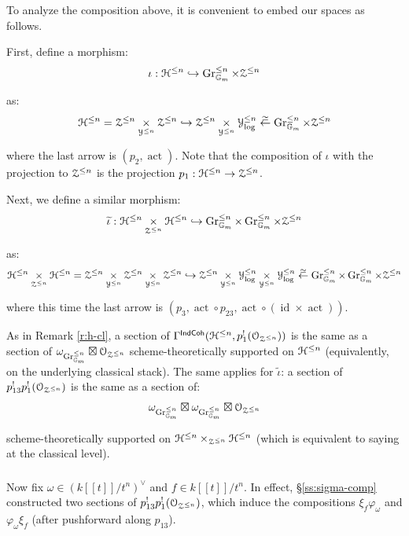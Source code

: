 \documentclass[reqno,11pt]{amsart}
\numberwithin{equation}{subsection}
\theoremstyle{remark}
\newcommand{\into}{\hookrightarrow}
\newcommand{\bG}{{\mathbb G}}
\newcommand{\sH}{{\EuScript H}}
\newcommand{\sO}{{\EuScript O}}
\newcommand{\sY}{{\EuScript Y}}
\newcommand{\sZ}{{\EuScript Z}}
\newcommand{\on}{\operatorname}
\newcommand{\id}{\on{id}}
\newcommand{\act}{\on{act}}
\newcommand{\vph}{\varphi}
\newcommand{\Gr}{\on{Gr}}
\newcommand{\IndCoh}{\mathsf{IndCoh}}
\begin{document}
To analyze the composition above, 
it is convenient to embed our spaces as follows.

First, define a morphism:
%
\[
\iota:\sH^{\leq n} \into \Gr_{\bG_m}^{\leq n} \times \sZ^{\leq n}
\]

\noindent as:
%
\[
\sH^{\leq n} = 
\sZ^{\leq n} \underset{\sY^{\leq n}}{\times} \sZ^{\leq n} 
\into 
\sZ^{\leq n} \underset{\sY^{\leq n}}{\times} \sY_{\log}^{\leq n}
\overset{\simeq}{\leftarrow} \Gr_{\bG_m}^{\leq n} \times \sZ^{\leq n} 
\]

\noindent where the last arrow is $(p_2,\act)$. Note that
the composition of $\iota$ with the projection to $\sZ^{\leq n}$
is the projection $p_1:\sH^{\leq n} \to \sZ^{\leq n}$.

Next, we define a similar morphism:
%
\[
\widetilde{\iota}:
\sH^{\leq n} \underset{\sZ^{\leq n}}{\times}
\sH^{\leq n} \into 
\Gr_{\bG_m}^{\leq n} \times \Gr_{\bG_m}^{\leq n} \times \sZ^{\leq n}
\]

\noindent as:
%
\[
\sH^{\leq n} \underset{\sZ^{\leq n}}{\times}
\sH^{\leq n} = 
\sZ^{\leq n} \underset{\sY^{\leq n}}{\times} \sZ^{\leq n} 
\underset{\sY^{\leq n}}{\times} \sZ^{\leq n} 
\into 
\sZ^{\leq n} \underset{\sY^{\leq n}}{\times} \sY_{\log}^{\leq n}
\underset{\sY^{\leq n}}{\times} \sY_{\log}^{\leq n}
\overset{\simeq}{\leftarrow} 
\Gr_{\bG_m}^{\leq n} \times \Gr_{\bG_m}^{\leq n} \times \sZ^{\leq n} 
\]

\noindent where this time the last arrow is 
$(p_3,\act \circ p_{23}, \act \circ (\id \times \act))$. 

As in Remark \ref{r:h-cl}, a section of 
$\Gamma^{\IndCoh}(\sH^{\leq n},p_1^!(\sO_{\sZ^{\leq n}}))$
is the same as a section of 
$\omega_{\Gr_{\bG_m}^{\leq n}} \boxtimes \sO_{\sZ^{\leq n}}$
scheme-theoretically supported on $\sH^{\leq n}$ 
(equivalently, on the underlying classical stack).
The same applies for 
$\widetilde{\iota}$: a section
of $p_{13}^!p_1^!(\sO_{\sZ^{\leq n}})$ is the same
as a section of:
%
\[
\omega_{\Gr_{\bG_m}^{\leq n}} \boxtimes \omega_{\Gr_{\bG_m}^{\leq n}} \boxtimes \sO_{\sZ^{\leq n}}
\]

\noindent scheme-theoretically supported on 
$\sH^{\leq n} \times_{\sZ^{\leq n}} \sH^{\leq n}$ (which is
equivalent to saying at the 
classical level).

\subsubsection{}\label{sss:recipe}

Now fix $\omega \in (k[[t]]/t^n)^{\vee}$ and $f \in k[[t]]/t^n$.
In effect, \S \ref{ss:sigma-comp} constructed two sections of
$p_{13}^!p_1^!(\sO_{\sZ^{\leq n}})$, which
induce the compositions 
$\xi_f\vph_{\omega}$ and $\vph_{\omega}\xi_f$ (after 
pushforward along $p_{13}$).
\end{document}
